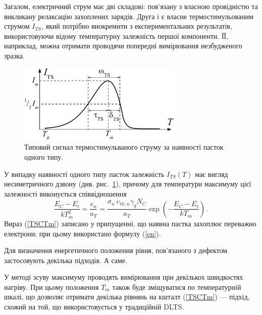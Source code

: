 \documentclass[10pt,a5paper,titlepage,oneside]{book}
\numberwithin{equation}{part}
\begin{document}
Загалом, електричний струм має дві складові:
пов'язану з власною провідністю та викликану релаксацію захоплених зарядів.
Друга і є власне термостимульованим струмом $I_{TS}$, який потрібно виокремити з експериментальних результатів,
використовуючи відому температурну залежність першої компоненти.
ЇЇ, наприклад, можна отримати проводячи попередні вимірювання незбудженого зразка.

\begin{figure}[t]
\center
\vspace{-2mm}
\includegraphics[width=0.7\textwidth]{Fig4_1}
\vspace{-3mm}
\caption{Типовий сигнал термостимульваного струму
за наявності пасток одного типу.}
\vspace{-3mm}
\label{F41}
\end{figure}

У випадку наявності одного типу пасток залежність $I_{TS}(T)$ має вигляд
несиметричного дзвону (див. рис.~\ref{F41}),
причому для температури максимуму цієї залежності виконується співвідношення
\begin{equation}
\label{TSCTm}
\frac{E_C-E_t}{kT_m^2}=\frac{e_n}{a_T}=\frac{\sigma_n\,\upsilon_{th,n}\gamma_g N_C}{a_T}\exp\left(-\frac{E_C-E_t}{kT_m}\right)\,.
\end{equation}
Вираз (\ref{TSCTm}) записано у припущенні, що наявна пастка захоплює переважно електрони;
при цьому використано формулу (\ref{en}).

Для визначення енергетичного положення рівня, пов'язаного з дефектом застосовують декілька підходів.
А саме.

У методі зсуву максимуму проводять вимірювання при декількох швидкостях нагріву.
При цьому положення $T_m$ також буде зміщуватися по температурній шкалі, що
дозволяє отримати декілька рівнянь на кшталт (\ref{TSCTm}) ---
підхід, схожий на той, що використовується у традиційній DLTS.
\end{document}
